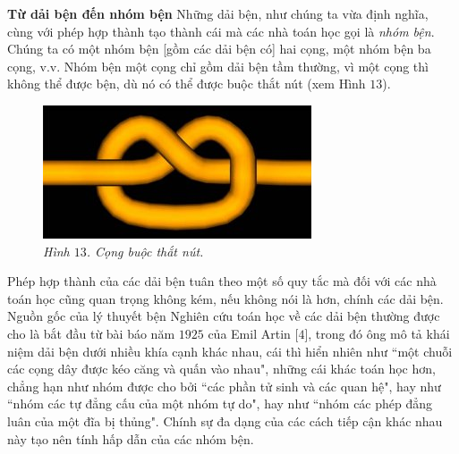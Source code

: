 \begin{multicols}{2}
\begin{figure}[H]
		\vspace*{-5pt}
	\end{figure}
	\textbf{\color{duongvaotoanhoc}Từ dải bện đến nhóm bện}
	\vskip 0.1cm
	Những dải bện, như chúng ta vừa định nghĩa, cùng với phép hợp thành tạo thành cái mà các nhà toán học gọi là \textit{nhóm bện}. Chúng ta có một nhóm bện [gồm các dải bện có] hai cọng, một nhóm bện ba cọng, v.v. Nhóm bện một cọng chỉ gồm dải bện tầm thường, vì một cọng thì không thể được bện, dù nó có thể được buộc thắt nút (xem Hình $13$).
	\begin{figure}[H]
		\vspace*{-5pt}
		\centering
		\captionsetup{labelformat= empty, justification=centering}
		\includegraphics[width= 0.6\linewidth]{fig_13}
		\caption{\small\textit{\color{duongvaotoanhoc}Hình $13$. Cọng buộc thắt nút.}}
		\vspace*{-10pt}
	\end{figure}
	Phép hợp thành của các dải bện tuân theo một số quy tắc mà đối với các nhà toán học cũng quan trọng không kém, nếu không nói là hơn, chính các dải bện.
	Nguồn gốc của lý thuyết bện
	\vskip 0.1cm
	Nghiên cứu toán học về các dải bện thường được cho là bắt đầu từ bài báo năm $1925$ của Emil Artin [$4$], trong đó ông mô tả khái niệm dải bện dưới nhiều khía cạnh khác nhau, cái thì hiển nhiên như ``một chuỗi các cọng dây được kéo căng và quấn vào nhau", những cái khác toán học hơn, chẳng hạn như nhóm được cho bởi ``các phần tử sinh và các quan hệ", hay như ``nhóm các tự đẳng cấu của một nhóm tự do", hay như  ``nhóm các phép đẳng luân của một đĩa bị thủng". Chính sự đa dạng của các cách tiếp cận khác nhau này tạo nên tính hấp dẫn của các nhóm bện.
	\vskip 0.15cm
	\vskip 0.1cm
	\begin{figure}[H]
		\vspace*{2pt}

\end{figure}
\end{multicols}
